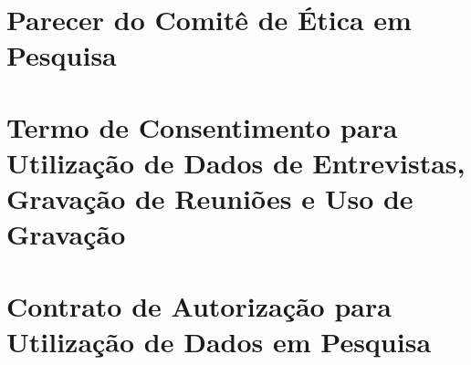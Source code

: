 \begin{anexosenv}

%     
%     
%     
%     

\chapter{Parecer do Comitê de Ética em Pesquisa}
\label{anexo:parecer-cep}









\chapter{Termo de Consentimento para Utilização de Dados de Entrevistas, Gravação de Reuniões e Uso de Gravação}
\label{anexo:termo-consentimento}






\chapter{Contrato de Autorização para Utilização de Dados em Pesquisa}
\label{anexo:contrato-autorizacao}


\end{anexosenv}
